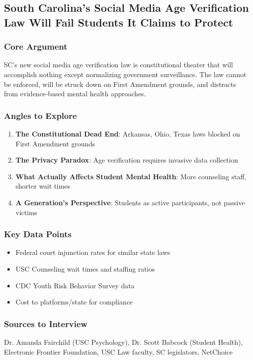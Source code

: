 \documentclass[11pt,letterpaper]{article}
\begin{document}
\newpage
\subsection{South Carolina's Social Media Age Verification Law Will Fail Students It Claims to Protect}

\subsubsection*{Core Argument}
SC's new social media age verification law is constitutional theater that will accomplish nothing except normalizing government surveillance. The law cannot be enforced, will be struck down on First Amendment grounds, and distracts from evidence-based mental health approaches.

\subsubsection*{Angles to Explore}
\begin{enumerate}[noitemsep]
    \item \textbf{The Constitutional Dead End}: Arkansas, Ohio, Texas laws blocked on First Amendment grounds
    \item \textbf{The Privacy Paradox}: Age verification requires invasive data collection
    \item \textbf{What Actually Affects Student Mental Health}: More counseling staff, shorter wait times
    \item \textbf{A Generation's Perspective}: Students as active participants, not passive victims
\end{enumerate}

\subsubsection*{Key Data Points}
\begin{itemize}[noitemsep]
    \item Federal court injunction rates for similar state laws
    \item USC Counseling wait times and staffing ratios
    \item CDC Youth Risk Behavior Survey data
    \item Cost to platforms/state for compliance
\end{itemize}

\subsubsection*{Sources to Interview}
Dr. Amanda Fairchild (USC Psychology), Dr. Scott Babcock (Student Health), Electronic Frontier Foundation, USC Law faculty, SC legislators, NetChoice
\end{document}
